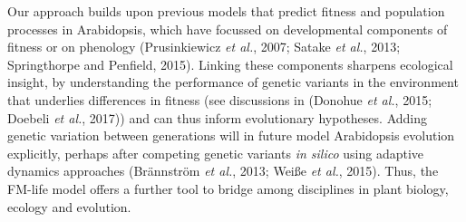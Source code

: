 \documentclass[phd]{infthesis}
\begin{document}
Our approach builds upon previous models that predict fitness and
population processes in Arabidopsis, which have focussed on
developmental components of fitness or on phenology (Prusinkiewicz
\emph{et al.}, 2007; Satake \emph{et al.}, 2013; Springthorpe and
Penfield, 2015). Linking these components sharpens ecological insight,
by understanding the performance of genetic variants in the environment
that underlies differences in fitness (see discussions in (Donohue
\emph{et al.}, 2015; Doebeli \emph{et al.}, 2017)) and can thus inform
evolutionary hypotheses. Adding genetic variation between generations
will in future model Arabidopsis evolution explicitly, perhaps after
competing genetic variants \emph{in silico} using adaptive dynamics
approaches (Brännström \emph{et al.}, 2013; Weiße \emph{et al.}, 2015).
Thus, the FM-life model offers a further tool to bridge among
disciplines in plant biology, ecology and evolution.

\singlespace

\printbibliography[heading=bibintoc]

\end{document}
